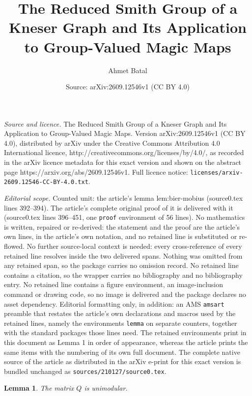 \documentclass[10pt,a4paper]{amsart}
\title{The Reduced Smith Group of a Kneser Graph and Its Application to Group-Valued Magic Maps}
\author{Ahmet Batal}
\date{Source: arXiv:2609.12546v1 (CC BY 4.0)}
\newtheorem{lemma}{Lemma}
\begin{document}
\maketitle

\noindent\emph{Source and licence.} The Reduced Smith Group of a Kneser Graph and Its Application to Group-Valued Magic Maps. Version arXiv:2609.12546v1 (CC BY 4.0), distributed by arXiv under the Creative Commons Attribution 4.0 International licence, http://creativecommons.org/licenses/by/4.0/, as recorded in the arXiv licence metadata for this exact version and shown on the abstract page https://arxiv.org/abs/2609.12546v1. Full licence notice: \texttt{licenses/arxiv-2609.12546-CC-BY-4.0.txt}.\par\smallskip

\noindent\textit{Editorial scope.} Counted unit: the article's lemma lem:bier-mobius (source0.tex lines 392--394). The article's complete original proof of it is delivered with it (source0.tex lines 396--451, one \texttt{proof} environment of 56 lines). No mathematics is written, repaired or re-derived: the statement and the proof are the article's own lines, in the article's own notation, and no retained line is substituted or re-flowed.  No further source-local context is needed: every cross-reference of every retained line resolves inside the two delivered spans.  Nothing was omitted from any retained span, so the package carries no omission record.  No retained line contains a citation, so the wrapper carries no bibliography and no bibliography entry.  No retained line contains a figure environment, an image-inclusion command or drawing code, so no image is delivered and the package declares no asset dependency.  Editorial formatting only, in addition: an AMS \texttt{amsart} preamble that restates the article's own declarations and macros used by the retained lines, namely the environments \texttt{lemma} on separate counters, together with the standard packages those lines need.  The retained environments print in this document as Lemma 1 in order of appearance, whereas the article prints the same items with the numbering of its own full document.  The complete native source of the article as distributed in the arXiv e-print for this exact version is bundled unchanged as \texttt{sources/210127/source0.tex}.
\begin{lemma}\label{lem:bier-mobius}
The matrix $Q$ is unimodular.
\end{lemma}
\end{document}
